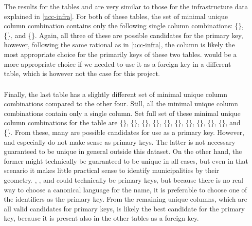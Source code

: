 The results for the tables  and  are very similar to those for the infrastructure data explained in \cref{ucc-infra}.
For both of these tables, the set of minimal unique column combination contains only the following single column combinations: \{\}, \{\}, and \{\}.
Again, all three of these are possible candidates for the primary key, however, following the same rational as in \cref{ucc-infra}, the  column is likely the most appropriate choice for the primarily keys of these two tables.  would be a more appropriate choice if we needed to use it as a foreign key in a different table, which is however not the case for this project.

\subsubsection{\texorpdfstring{}{bz\_admin\_municipality}}

Finally, the last table has a slightly different set of minimal unique column combinations compared to the other four. Still, all the minimal unique column combinations contain only a single column. Set full set of these minimal unique column combinations for the  table are \{\}, \{\}, \{\}, \{\}, \{\}, \{\}, \{\}, \{\}, \{\},  \{\}, and \{\}.
From these, many are possible candidates for use as a primary key. However,  and especially  do not make sense as primary keys. The latter is not necessary guaranteed to be unique in general outside this dataset. On the other hand, the former might technically be guaranteed to be unique in all cases, but even in that scenario it makes little practical sense to identify municipalities by their geometry.
, , and  could technically be primary keys, but because there is no real way to choose a canonical language for the name, it is preferable to choose one of the identifiers as the primary key.
From the remaining unique columns, which are all valid candidates for primary keys,  is likely the best candidate for the primary key, because it is present also in the other tables as a foreign key.

